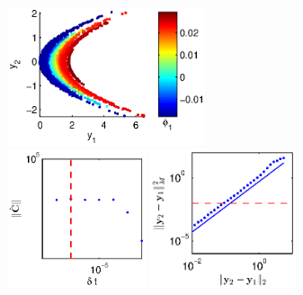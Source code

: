 \def \figheight {1.6in}

\begin{figure}[t]

\begin{subfigure}{\textwidth}
\includegraphics[height=\figheight]{data_nonlinear_NIV_dt1_kernel1}
\hfill
\includegraphics[height=\figheight]{C_dt_nonlinear_dt1_kernel1}
\hfill
\includegraphics[height=\figheight]{dist_dy_nonlinear_dt1_kernel1}
\end{subfigure}


\end{figure}
